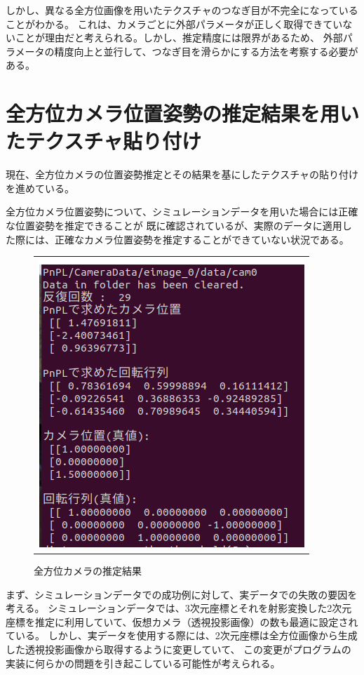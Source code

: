 \documentclass[]{jarticle}          %
\begin{document}
しかし、異なる全方位画像を用いたテクスチャのつなぎ目が不完全になっていることがわかる。
これは、カメラごとに外部パラメータが正しく取得できていないことが理由だと考えられる。しかし、推定精度には限界があるため、
外部パラメータの精度向上と並行して、つなぎ目を滑らかにする方法を考察する必要がある。

\section{全方位カメラ位置姿勢の推定結果を用いたテクスチャ貼り付け}

現在、全方位カメラの位置姿勢推定とその結果を基にしたテクスチャの貼り付けを進めている。

全方位カメラ位置姿勢について、シミュレーションデータを用いた場合には正確な位置姿勢を推定できることが
既に確認されているが、実際のデータに適用した際には、正確なカメラ位置姿勢を推定することができていない状況である。

\begin{figure}[!ht]
  \begin{center}
    \begin{tabular}{c}
      \includegraphics[keepaspectratio, scale=0.5]{figures/kekka.png}
    \end{tabular}
  \end{center}
  \caption{全方位カメラの推定結果}
  \label{two}
\end{figure}

まず、シミュレーションデータでの成功例に対して、実データでの失敗の要因を考える。
シミュレーションデータでは、3次元座標とそれを射影変換した2次元座標を推定に利用していて、仮想カメラ（透視投影画像）の数も最適に設定されている。
しかし、実データを使用する際には、2次元座標は全方位画像から生成した透視投影画像から取得するように変更していて、
この変更がプログラムの実装に何らかの問題を引き起こしている可能性が考えられる。
\end{document}
